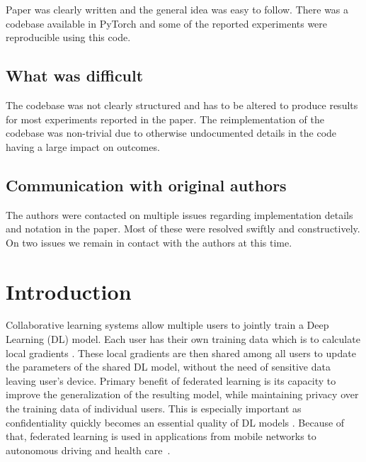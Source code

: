 Paper was clearly written and the general idea was easy to follow. There was a codebase available in PyTorch and some of the reported experiments were reproducible using this code.

\subsection{What was difficult}

The codebase was not clearly structured and has to be altered to produce results for most experiments reported in the paper. The reimplementation of the codebase was non-trivial due to otherwise undocumented details in the code having a large impact on outcomes.

\subsection*{Communication with original authors}

The authors were contacted on multiple issues regarding implementation details and notation in the paper. Most of these were resolved swiftly and constructively. On two issues we remain in contact with the authors at this time. 

\newpage


\section{Introduction}
\label{sec:intro}

Collaborative learning systems allow multiple users to jointly train a Deep Learning (DL) model. Each user has their own training data which is to calculate local gradients \cite{yang2019federated}\cite{guo2020towards}\cite{melis2019exploiting}. These local gradients are then shared among all users to update the parameters of the shared DL model, without the need of sensitive data leaving user's device. Primary benefit of federated learning is its capacity to improve the generalization of the resulting model, while maintaining privacy over the training data of individual users. This is especially important as confidentiality quickly becomes an essential quality of DL models \cite{abadi2016deep}. Because of that, federated learning is used in applications from mobile networks \cite{kang2019} to autonomous driving \cite{niknam2020federated} and health care~\cite{brisimi2018federated}.

